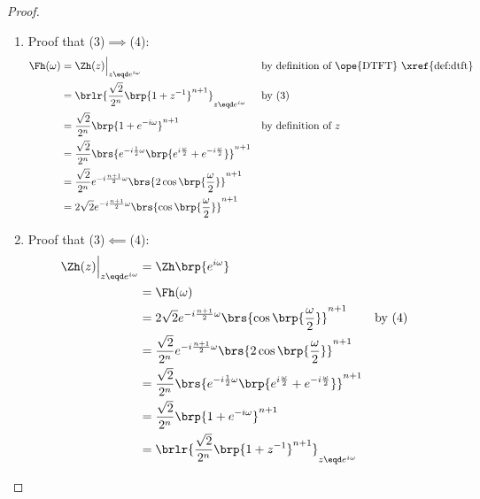 \begin{proof}
\begin{enumerate}
  \item Proof that (3)$\implies$(4):\\
    \begin{align*}
      \Fh(\omega)
          &= \Zh(z)\Big|_{z\eqd e^{i\omega}}
          && \text{by definition of \ope{DTFT} \xref{def:dtft}}
        \\&= \brlr{\frac{\sqrt{2}}{2^n}\brp{1+z^{-1}}^{n+1}}_{z\eqd e^{i\omega}}
          && \text{by (3)}
        \\&= \frac{\sqrt{2}}{2^n}\brp{1+e^{-i\omega}}^{n+1}
          && \text{by definition of $z$}
        \\&= \frac{\sqrt{2}}{2^n} \brs{ e^{-i\frac{1}{2}\omega}\brp{e^{i\frac{\omega}{2}}+e^{-i\frac{\omega}{2}}}}^{n+1}
        \\&= \frac{\sqrt{2}}{2^n} e^{-i\frac{n+1}{2}\omega}\brs{2\cos\brp{\frac{\omega}{2}}}^{n+1}
        \\&= 2\sqrt{2} e^{-i\frac{n+1}{2}\omega}\brs{\cos\brp{\frac{\omega}{2}}}^{n+1}
    \end{align*}

  \item Proof that (3)$\impliedby$(4):
    \begin{align*}
      \Zh(z)\Big|_{z\eqd e^{i\omega}}
          &= \Zh\brp{e^{i\omega}}
        \\&= \Fh(\omega)
        \\&= 2\sqrt{2} e^{-i\frac{n+1}{2}\omega}\brs{\cos\brp{\frac{\omega}{2}}}^{n+1}
          && \text{by (4)}
        \\&= \frac{\sqrt{2}}{2^n} e^{-i\frac{n+1}{2}\omega}\brs{2\cos\brp{\frac{\omega}{2}}}^{n+1}
        \\&= \frac{\sqrt{2}}{2^n} \brs{ e^{-i\frac{1}{2}\omega}\brp{e^{i\frac{\omega}{2}}+e^{-i\frac{\omega}{2}}}}^{n+1}
        \\&= \frac{\sqrt{2}}{2^n}\brp{1+e^{-i\omega}}^{n+1}
        \\&= \brlr{\frac{\sqrt{2}}{2^n}\brp{1+z^{-1}}^{n+1}}_{z\eqd e^{i\omega}}
    \end{align*}
\end{enumerate}
\end{proof}

